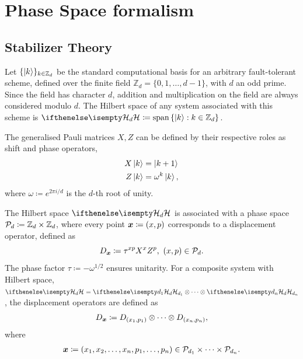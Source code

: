\documentclass[pra,
aps,
twocolumn,
superscriptaddress,
groupedaddress,
nofootinbib,
reprint
]{revtex4-1}
\begin{document}
\section{Phase Space formalism}
\label{sec:ps}

\subsection{Stabilizer Theory}\label{sec:so}


Let $\{\ket{k}\}_{k \in \mathbb{Z}_d}$ be the standard computational basis for an arbitrary fault-tolerant scheme, defined over the finite field $\mathbb{Z}_d = \{ 0, 1, \dots,d-1 \}$, with $d$ an odd prime. 
Since the field has character $d$, addition and multiplication on the field are always considered modulo $d$.
The Hilbert space of any system associated with this scheme is $\hd \coloneqq \spanv{\ket{k}: k \in \mathbb{Z}_d}$.

The generalised Pauli matrices $X, Z$ can be defined by their respective roles as shift and phase operators,
\begin{align}
    X \ket{k} &= \ket{k + 1} \label{eq:xpauli}\\
	Z \ket{k} &= \omega^k \ket{k}, \label{eq:zpauli}
\end{align}
where $\omega \coloneqq e^{2\pi i/d}$ is the $d$-th root of unity. 

The Hilbert space $\hd$ is associated with a phase space $\cal{P}_d \coloneqq \mathbb{Z}_d \times \mathbb{Z}_d$, where every point $\bmx \coloneqq (x, p)$ corresponds to a displacement operator, defined as
\begin{equation}\label{eq:ddef}
    D_{\bmx} \coloneqq \tau^{x p} X^{x} Z^{p},\ (x, p) \in \cal{P}_d.
\end{equation}
The phase factor $\tau \coloneqq -\omega^{1/2}$ ensures unitarity.
For a composite system with Hilbert space, $\hd = \hd[d_1] \otimes \dots \otimes \hd[d_n]$, the displacement operators are defined as
\begin{equation}\label{eq:composited}
    D_{\bmx} \coloneqq D_{(x_1, p_1)} \otimes \dots \otimes D_{(x_n, p_n)},
\end{equation}
where 
\begin{align}
	\bmx \coloneqq (x_1, x_2, \dots, x_n, p_1, \dots, p_n) \in \cal{P}_{d_1} \times \dots \times \cal{P}_{d_n}.
\end{align}
\end{document}
